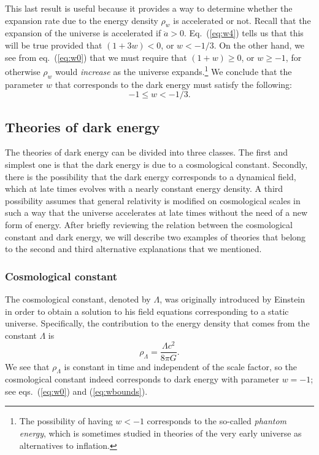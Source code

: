 This last result is useful because it provides a way to determine whether the expansion rate due to the energy density $\rho_w$ is accelerated or not. Recall that the expansion of the universe is accelerated if $\ddot{a}>0$. Eq.\ (\ref{eq:w4}) tells us that this will be true provided that $(1+3w)<0$, or $w<-1/3$. On the other hand, we see from eq.\ (\ref{eq:w0}) that we must require that $(1+w)\geq0$, or $w\geq-1$, for otherwise $\rho_w$ would {\it increase} as the universe expands.\footnote{The possibility of having $w<-1$ corresponds to the so-called {\it phantom energy}, which is sometimes studied in theories of the very early universe as alternatives to inflation.} We conclude that the parameter $w$ that corresponds to the dark energy must satisfy the following:
\begin{equation} \label{eq:wbounds}
-1\leq w <-1/3.
\end{equation}

\subsection{Theories of dark energy}

The theories of dark energy can be divided into three classes. The first and simplest one is that the dark energy is due to a cosmological constant. Secondly, there is the possibility that the dark energy corresponds to a dynamical field, which at late times evolves with a nearly constant energy density. A third possibility assumes that general relativity is modified on cosmological scales in such a way that the universe accelerates at late times without the need of a new form of energy. After briefly reviewing the relation between the cosmological constant and dark energy, we will describe two examples of theories that belong to the second and third alternative explanations that we mentioned.

\subsubsection{Cosmological constant}

The cosmological constant, denoted by $\Lambda$, was originally introduced by Einstein in order to obtain a solution to his field equations corresponding to a static universe. Specifically, the contribution to the energy density that comes from the constant $\Lambda$ is
\begin{equation}
\rho_{\Lambda}=\frac{\Lambda c^2}{8\pi G}.
\end{equation}
We see that $\rho_{\Lambda}$ is constant in time and independent of the scale factor, so the cosmological constant indeed corresponds to dark energy with parameter $w=-1$; see eqs.\ (\ref{eq:w0}) and (\ref{eq:wbounds}).

